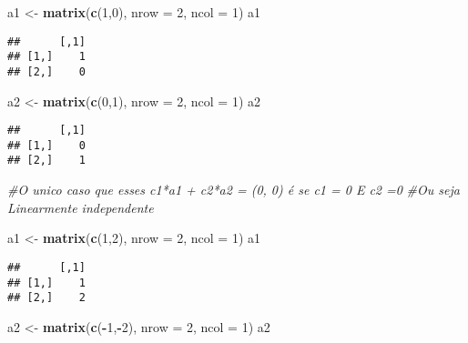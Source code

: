 \documentclass[
]{article}
\newenvironment{Shaded}{\begin{snugshade}}{\end{snugshade}}
\newcommand{\AttributeTok}[1]{\textcolor[rgb]{0.13,0.29,0.53}{#1}}
\newcommand{\CommentTok}[1]{\textcolor[rgb]{0.56,0.35,0.01}{\textit{#1}}}
\newcommand{\DecValTok}[1]{\textcolor[rgb]{0.00,0.00,0.81}{#1}}
\newcommand{\FunctionTok}[1]{\textcolor[rgb]{0.13,0.29,0.53}{\textbf{#1}}}
\newcommand{\NormalTok}[1]{#1}
\newcommand{\OtherTok}[1]{\textcolor[rgb]{0.56,0.35,0.01}{#1}}
\newcommand{\SpecialCharTok}[1]{\textcolor[rgb]{0.81,0.36,0.00}{\textbf{#1}}}
\begin{document}
\begin{Shaded}
\begin{Highlighting}[]
\NormalTok{a1 }\OtherTok{\textless{}{-}} \FunctionTok{matrix}\NormalTok{(}\FunctionTok{c}\NormalTok{(}\DecValTok{1}\NormalTok{,}\DecValTok{0}\NormalTok{), }\AttributeTok{nrow =} \DecValTok{2}\NormalTok{, }\AttributeTok{ncol =} \DecValTok{1}\NormalTok{)}
\NormalTok{a1}
\end{Highlighting}
\end{Shaded}

\begin{verbatim}
##      [,1]
## [1,]    1
## [2,]    0
\end{verbatim}

\begin{Shaded}
\begin{Highlighting}[]
\NormalTok{a2 }\OtherTok{\textless{}{-}} \FunctionTok{matrix}\NormalTok{(}\FunctionTok{c}\NormalTok{(}\DecValTok{0}\NormalTok{,}\DecValTok{1}\NormalTok{), }\AttributeTok{nrow =} \DecValTok{2}\NormalTok{, }\AttributeTok{ncol =} \DecValTok{1}\NormalTok{)}
\NormalTok{a2}
\end{Highlighting}
\end{Shaded}

\begin{verbatim}
##      [,1]
## [1,]    0
## [2,]    1
\end{verbatim}

\begin{Shaded}
\begin{Highlighting}[]
\CommentTok{\#O unico caso que esses c1*a1 + c2*a2 = (0, 0) é se c1 = 0 E c2 =0}
\CommentTok{\#Ou seja Linearmente independente}

\NormalTok{a1 }\OtherTok{\textless{}{-}} \FunctionTok{matrix}\NormalTok{(}\FunctionTok{c}\NormalTok{(}\DecValTok{1}\NormalTok{,}\DecValTok{2}\NormalTok{), }\AttributeTok{nrow =} \DecValTok{2}\NormalTok{, }\AttributeTok{ncol =} \DecValTok{1}\NormalTok{)}
\NormalTok{a1}
\end{Highlighting}
\end{Shaded}

\begin{verbatim}
##      [,1]
## [1,]    1
## [2,]    2
\end{verbatim}

\begin{Shaded}
\begin{Highlighting}[]
\NormalTok{a2 }\OtherTok{\textless{}{-}} \FunctionTok{matrix}\NormalTok{(}\FunctionTok{c}\NormalTok{(}\SpecialCharTok{{-}}\DecValTok{1}\NormalTok{,}\SpecialCharTok{{-}}\DecValTok{2}\NormalTok{), }\AttributeTok{nrow =} \DecValTok{2}\NormalTok{, }\AttributeTok{ncol =} \DecValTok{1}\NormalTok{)}
\NormalTok{a2}
\end{Highlighting}
\end{Shaded}
\end{document}
